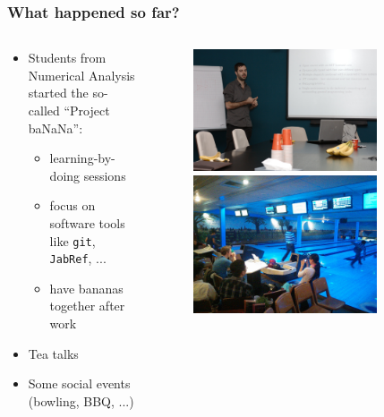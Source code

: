 \documentclass{beamer}
\begin{document}
\begin{frame}
\frametitle{What happened so far?}
\begin{columns}
 \begin{column}{0.8\textwidth}
 \begin{itemize}
  \item Students from Numerical Analysis started the so-called ``Project ba{\color{red}NaN}a'':
  \begin{itemize}
  \item learning-by-doing sessions
  \item focus on software tools like \texttt{git}, \texttt{JabRef}, ...
  \item have bananas together after work
 \end{itemize}
 \item Tea talks
 \item Some social events (bowling, BBQ, ...)
 \end{itemize}
 \end{column}

 \begin{column}{0.4\textwidth}
  \begin{figure}[t]
  \centering
  \includegraphics[width=0.8\textwidth]{images/moritz} \vspace{0.6cm}\\
  \includegraphics[width=0.8\textwidth]{images/bowling}
  \end{figure}
 \end{column}
 \end{columns}
\end{frame}
\end{document}
